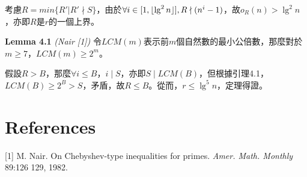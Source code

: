 \documentclass{article}
\DeclarePairedDelimiter\floor{\lfloor}{\rfloor}
\begin{document}
    考慮$R=min\{R'|R'\nmid S\}$，由於$\forall i\in[1, \floor{\lg^2n}], R\nmid(n^i-1)$，故$o_R(n)>\lg^2n$，亦即$R$是$r$的一個上界。

\begin{mdframed}
\noindent\textbf{Lemma 4.1} \textit{(Nair [1])} 令$LCM(m)$表示前$m$個自然數的最小公倍數，那麼對於$m\geq 7$，$LCM(m)\geq 2^m$。
\end{mdframed}

    假設$R>B$，那麼$\forall i\leq B$，$i\mid S$，亦即$S\mid LCM(B)$，但根據引理4.1，$LCM(B)\geq 2^B>S$，矛盾，故$R\leq B$。從而，$r\leq \lg^5n$，定理得證。

\section{References}

    [1] M. Nair. On Chebyshev-type inequalities for primes. \textit{Amer. Math. Monthly} 89:126 129, 1982.
    
\end{document}
